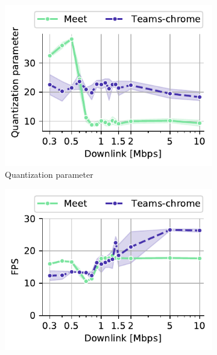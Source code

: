 \begin{figure}[]
    \begin{subfigure}[t]{0.3\textwidth}      
    		\centering
        \includegraphics[width=\textwidth,keepaspectratio]{figures/static/downlink_r_qpsum.pdf}
        \vspace{-2em}
        \caption{Quantization parameter}
 		\label{subfig:downlink_video_bitrate}
    \end{subfigure}%
    \hfill
	\begin{subfigure}[t]{0.3\textwidth}   
        \centering
        \includegraphics[width=\textwidth]{figures/static/downlink_received_framesPerSecond.pdf}

\end{subfigure}
\end{figure}
